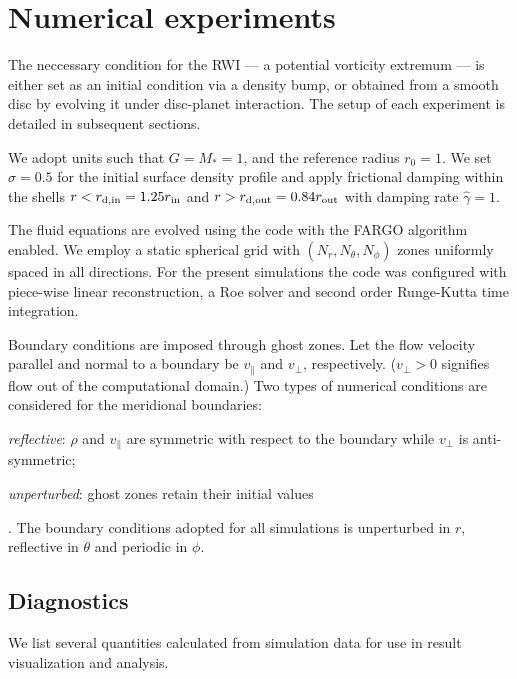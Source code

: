 \section{Numerical experiments}\label{sims}
The neccessary condition for the RWI --- a potential vorticity 
extremum --- is either set as an initial condition via a density bump, 
or obtained from a smooth disc by evolving it under disc-planet
interaction. The setup of each experiment is detailed in subsequent
sections.    

We adopt units such that $G=M_*=1$, and the reference radius $r_0=1$.    
We set $\sigma=0.5$ for the initial surface density profile and apply 
frictional damping within the shells $r<r_\mathrm{d,in} = 1.25r_\mathrm{in}$
and $r>r_\mathrm{d,out}=0.84r_\mathrm{out}$ with damping rate $\hat{\gamma}=1$. 

The fluid equations are evolved using the \pluto code \citep{mignone07} with 
the FARGO algorithm enabled\citep{mignone12}. We employ a static
spherical grid with $(N_r, N_\theta, N_\phi)$ zones uniformly spaced
in all directions. For the present simulations the code was configured
with piece-wise linear reconstruction, a Roe solver and second order
Runge-Kutta time integration.   

Boundary conditions are imposed through ghost zones.   
Let the flow velocity parallel and normal to a boundary be
$v_\parallel$ and $v_\perp$, respectively. ($v_\perp>0$ signifies flow
out of the computational domain.) Two types of numerical 
conditions are considered for the meridional boundaries:
\begin{inparaenum}[(a)]
\item \emph{reflective}: $\rho$ and $v_\parallel$ are symmetric with
  respect to the boundary while $v_\perp$ is anti-symmetric;  
\item \emph{unperturbed}: ghost zones retain their initial values
\end{inparaenum}.
The boundary conditions adopted for all simulations is unperturbed in
$r$, reflective in $\theta$ and periodic in $\phi$. 


\subsection{Diagnostics}
We list several quantities calculated from simulation data for use in
result visualization and analysis.  

